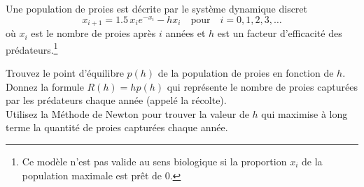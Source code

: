 \begin{question}[\life]
Une population de proies est décrite par le système dynamique discret
\[
x_{i+1} = 1.5\, x_i e^{-x_i} - h x_i \quad \text{pour} \quad i=0, 1, 2, 3,
\ldots
\]
où $x_i$ est le nombre de proies après $i$ années et $h$ est un facteur
d'efficacité des prédateurs.\footnote{Ce modèle n'est pas valide au
sens biologique si la proportion $x_i$ de la population maximale
est prêt de $0$.}

 Trouvez le point d'équilibre $p(h)$ de la population de proies
en fonction de $h$.\\
 Donnez la formule $R(h) = h p(h)$ qui représente le
nombre de proies capturées par les prédateurs chaque année (appelé la
récolte).\\
 Utilisez la Méthode de Newton pour trouver la valeur de $h$ qui
maximise à long terme la quantité de proies capturées chaque année.
\label{6Q123}
\end{question}

